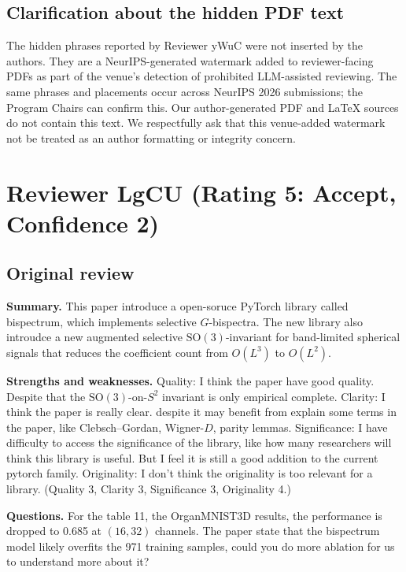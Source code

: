 \documentclass[10pt]{article}
\newenvironment{reviewquote}%
  {\par\medskip\begingroup\color{reviewgray}\small%
   \list{}{\leftmargin=1.5em\rightmargin=1.5em}\item\relax}%
  {\endlist\endgroup\par\medskip}
\begin{document}
\subsection*{Clarification about the hidden PDF text}

The hidden phrases reported by Reviewer yWuC were not inserted by the authors.
They are a NeurIPS-generated watermark added to reviewer-facing PDFs as part
of the venue's detection of prohibited LLM-assisted reviewing. The same
phrases and placements occur across NeurIPS 2026 submissions; the Program
Chairs can confirm this. Our author-generated PDF and LaTeX sources do not
contain this text. We respectfully ask that this venue-added watermark not be
treated as an author formatting or integrity concern.

\section{Reviewer LgCU (Rating 5: Accept, Confidence 2)}

\subsection{Original review}

\begin{reviewquote}
\textbf{Summary.} This paper introduce a open-soruce PyTorch library called
bispectrum, which implements selective $G$-bispectra. The new library also
introudce a new augmented selective $\mathrm{SO}(3)$-invariant for
band-limited spherical signals that reduces the coefficient count from
$O(L^3)$ to $O(L^2)$.

\textbf{Strengths and weaknesses.}
Quality: I think the paper have good quality. Despite that the
$\mathrm{SO}(3)$-on-$S^2$ invariant is only empirical complete.
Clarity: I think the paper is really clear. despite it may benefit from
explain some terms in the paper, like Clebsch--Gordan, Wigner-$D$, parity
lemmas.
Significance: I have difficulty to access the significance of the library,
like how many researchers will think this library is useful. But I feel it is
still a good addition to the current pytorch family.
Originality: I don't think the originality is too relevant for a library.
(Quality 3, Clarity 3, Significance 3, Originality 4.)

\textbf{Questions.} For the table 11, the OrganMNIST3D results, the
performance is dropped to 0.685 at $(16, 32)$ channels. The paper state that
the bispectrum model likely overfits the 971 training samples, could you do
more ablation for us to understand more about it?
\end{reviewquote}
\end{document}
